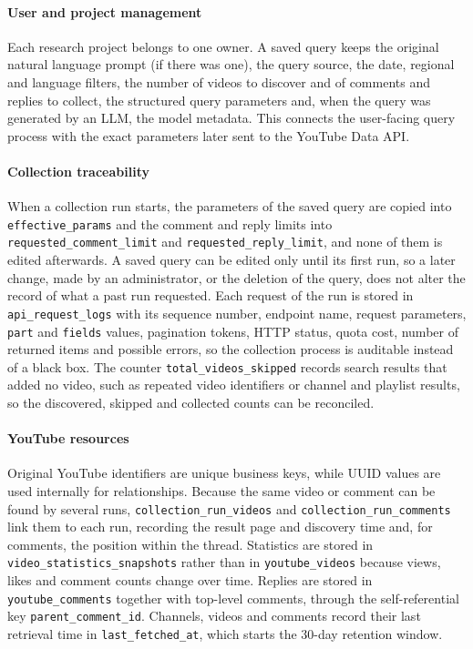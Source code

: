 \paragraph{User and project management}

Each research project belongs to one owner. A saved query keeps the original natural language prompt (if there was one), the query source, the date, regional and language filters, the number of videos to discover and of comments and replies to collect, the structured query parameters and, when the query was generated by an LLM, the model metadata. This connects the user-facing query process with the exact parameters later sent to the YouTube Data API.

\paragraph{Collection traceability}

When a collection run starts, the parameters of the saved query are copied into \texttt{effective\_\allowbreak params} and the comment and reply limits into \texttt{requested\_\allowbreak comment\_\allowbreak limit} and \texttt{requested\_\allowbreak reply\_\allowbreak limit}, and none of them is edited afterwards. A saved query can be edited only until its first run, so a later change, made by an administrator, or the deletion of the query, does not alter the record of what a past run requested. Each request of the run is stored in \texttt{api\_request\_logs} with its sequence number, endpoint name, request parameters, \texttt{part} and \texttt{fields} values, pagination tokens, HTTP status, quota cost, number of returned items and possible errors, so the collection process is auditable instead of a black box. The counter \texttt{total\_\allowbreak videos\_\allowbreak skipped} records search results that added no video, such as repeated video identifiers or channel and playlist results, so the discovered, skipped and collected counts can be reconciled.

\paragraph{YouTube resources}

Original YouTube identifiers are unique business keys, while UUID values are used internally for relationships. Because the same video or comment can be found by several runs, \texttt{collection\_\allowbreak run\_\allowbreak videos} and \texttt{collection\_\allowbreak run\_\allowbreak comments} link them to each run, recording the result page and discovery time and, for comments, the position within the thread. Statistics are stored in \texttt{video\_\allowbreak statistics\_\allowbreak snapshots} rather than in \texttt{youtube\_videos} because views, likes and comment counts change over time. Replies are stored in \texttt{youtube\_comments} together with top-level comments, through the self-referential key \texttt{parent\_\allowbreak comment\_\allowbreak id}. Channels, videos and comments record their last retrieval time in \texttt{last\_\allowbreak fetched\_\allowbreak at}, which starts the 30-day retention window.

